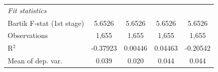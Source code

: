\begin{tabular}{lcccc}
   \midrule
   \emph{Fit statistics}\\
   Bartik F-stat (1st stage)                                  & 5.6526                             & 5.6526                          & 5.6526                               & 5.6526\\  
   Observations                                                   & 1,655                              & 1,655                           & 1,655                                & 1,655\\  
   R$^2$                                                          & -0.37923                           & 0.00446                         & 0.04463                              & -0.20542\\  
   Mean of dep. var.                                              & 0.039                              & 0.020                           & 0.044                                & 0.044\\  
\bottomrule
\end{tabular}
